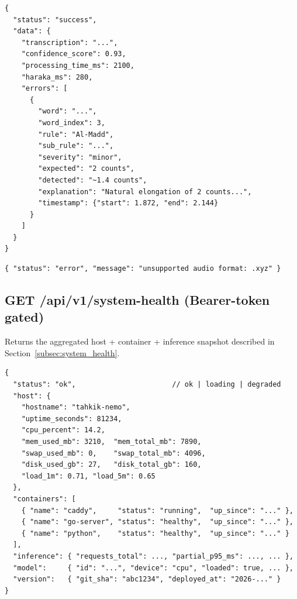\begin{emeraldbox}[title=Success Response (200 OK) --- with reference\_text]
\begin{verbatim}
{
  "status": "success",
  "data": {
    "transcription": "...",
    "confidence_score": 0.93,
    "processing_time_ms": 2100,
    "haraka_ms": 280,
    "errors": [
      {
        "word": "...",
        "word_index": 3,
        "rule": "Al-Madd",
        "sub_rule": "...",
        "severity": "minor",
        "expected": "2 counts",
        "detected": "~1.4 counts",
        "explanation": "Natural elongation of 2 counts...",
        "timestamp": {"start": 1.872, "end": 2.144}
      }
    ]
  }
}
\end{verbatim}
\end{emeraldbox}

\begin{warnbox}[title=Error Response (4xx / 5xx)]
\begin{verbatim}
{ "status": "error", "message": "unsupported audio format: .xyz" }
\end{verbatim}
\end{warnbox}

\subsection{GET /api/v1/system-health (Bearer-token gated)}

Returns the aggregated host + container + inference snapshot described in Section~\ref{subsec:system_health}.

\begin{emeraldbox}[title=Response (200 OK) --- shape only]
\begin{verbatim}
{
  "status": "ok",                       // ok | loading | degraded
  "host": {
    "hostname": "tahkik-nemo",
    "uptime_seconds": 81234,
    "cpu_percent": 14.2,
    "mem_used_mb": 3210,  "mem_total_mb": 7890,
    "swap_used_mb": 0,    "swap_total_mb": 4096,
    "disk_used_gb": 27,   "disk_total_gb": 160,
    "load_1m": 0.71, "load_5m": 0.65
  },
  "containers": [
    { "name": "caddy",     "status": "running",  "up_since": "..." },
    { "name": "go-server", "status": "healthy",  "up_since": "..." },
    { "name": "python",    "status": "healthy",  "up_since": "..." }
  ],
  "inference": { "requests_total": ..., "partial_p95_ms": ..., ... },
  "model":     { "id": "...", "device": "cpu", "loaded": true, ... },
  "version":   { "git_sha": "abc1234", "deployed_at": "2026-..." }
}
\end{verbatim}
\end{emeraldbox}


